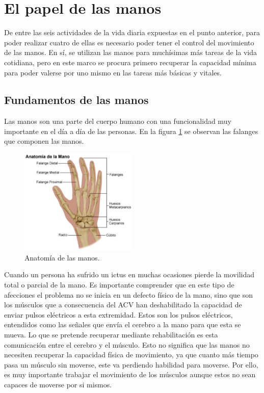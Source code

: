 \section{El papel de las manos}
\label{sec:manos2}

De entre las seis actividades de la vida diaria expuestas en el punto anterior, para poder realizar cuatro de ellas es necesario poder tener el control del movimiento de las manos. En sí, se utilizan las manos para muchísimas más tareas de la vida cotidiana, pero en este marco se procura primero recuperar la capacidad mínima para poder valerse por uno mismo en las tareas más básicas y vitales.



\subsection{Fundamentos de las manos}
\label{sec:fuindamentos2}

Las manos son una parte del cuerpo humano con una funcionalidad muy importante en el día a día de las personas. En la figura \ref{fig:anatomiaMano} se observan las falanges que componen las manos. 

\begin{figure}[H]
	\centering
	\includegraphics[width=0.5\textwidth]{./img/anatomiaMano}
	\caption{Anatomía de las manos.  \cite{imgAnatomiaMano}}
	\label{fig:anatomiaMano}
\end{figure} 

Cuando un persona ha sufrido un ictus en muchas ocasiones pierde la movilidad total o parcial de la mano. Es importante comprender que en este tipo de afecciones el problema no se inicia en un defecto físico de la mano, sino que son los músculos que a consecuencia del ACV han deshabilitado la capacidad de enviar pulsos eléctricos a esta extremidad. Estos son los pulsos eléctricos, entendidos como las señales que envía el cerebro a la mano para que esta se mueva. Lo que se pretende recuperar mediante rehabilitación es esta comunicación entre el cerebro y el músculo. Esto no significa que las manos no necesiten recuperar la capacidad física de movimiento, ya que cuanto más tiempo pasa un músculo sin moverse, este va perdiendo habilidad para moverse. Por ello, es muy importante trabajar el movimiento de los músculos aunque estos no sean capaces de moverse por si mismos.

